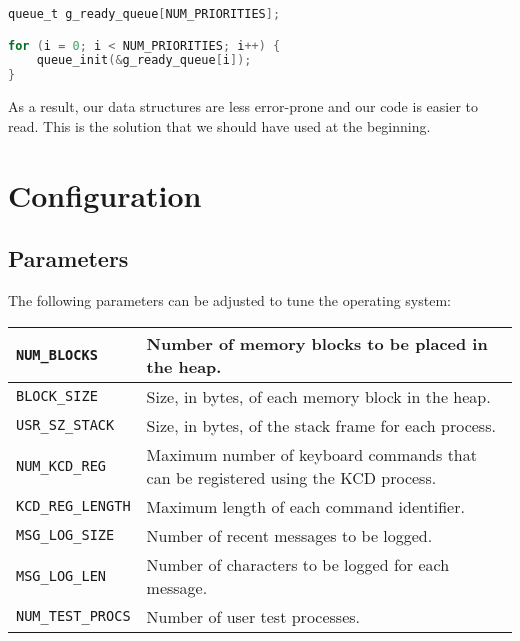 \documentclass[12pt]{report}
\begin{document}
\begin{minipage}{\textwidth}
\begin{lstlisting}[language=C]
queue_t g_ready_queue[NUM_PRIORITIES];

for (i = 0; i < NUM_PRIORITIES; i++) {
    queue_init(&g_ready_queue[i]);
}
\end{lstlisting}
\end{minipage}

As a result, our data structures are less error-prone and our code is easier to read. This is the solution that we should have used at the beginning.

\appendix


\chapter{Configuration}
\label{app:configuration}

\section{Parameters}

The following parameters can be adjusted to tune the operating system:\\

\begin{tabularx}{\textwidth}{| l | X |}
    \hline
    \texttt{NUM_BLOCKS} & Number of memory blocks to be placed in the heap.\\
    \hline
    \texttt{BLOCK_SIZE} & Size, in bytes, of each memory block in the heap.\\
    \hline
    \texttt{USR_SZ_STACK} & Size, in bytes, of the stack frame for each process.\\
    \hline
    \texttt{NUM_KCD_REG} & Maximum number of keyboard commands that can be registered using the KCD process.\\
    \hline
    \texttt{KCD_REG_LENGTH} & Maximum length of each command identifier.\\
    \hline
    \texttt{MSG_LOG_SIZE} & Number of recent messages to be logged.\\
    \hline
    \texttt{MSG_LOG_LEN} & Number of characters to be logged for each message.\\
    \hline
    \texttt{NUM_TEST_PROCS} & Number of user test processes.\\
    \hline
\end{tabularx}
\end{document}
